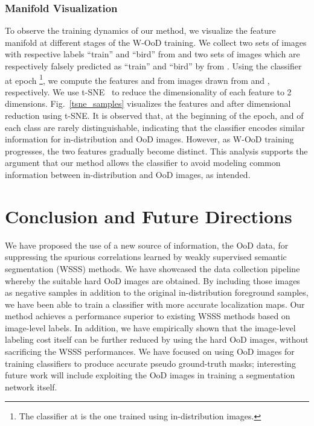 \documentclass[10pt,twocolumn,letterpaper]{article}
\begin{document}
\begin{table*}[t]
\begin{minipage}{0.3\linewidth}
{\subsubsection{Manifold Visualization}
\vspace{-0.4em}
To observe the training dynamics of our method, we visualize the feature manifold at different stages of the W-OoD training. 
We collect two sets of images with respective labels ``train'' and ``bird'' from  and two sets of images which are respectively falsely predicted as ``train'' and ``bird'' by  from .
Using the classifier at epoch \footnote{The classifier at  is the one trained using in-distribution images.}, we compute the features  and  from images drawn from  and , respectively.
We use t-SNE~\cite{maaten2008visualizing} to reduce the dimensionality of each feature to 2 dimensions.
Fig.~\ref{tsne_samples} visualizes the features  and  after dimensional reduction using t-SNE. 
It is observed that, at the beginning of the epoch,  and  of each class are rarely distinguishable, indicating that the classifier encodes similar information for in-distribution and OoD images. However, as W-OoD training progresses, the two features gradually become distinct.
This analysis supports the argument that our method allows the classifier to avoid modeling common information between in-distribution and OoD images, as intended.























\vspace{-0.5em}
\section{Conclusion and Future Directions}
\vspace{-0.3em}
We have proposed the use of a new source of information, the OoD data, for suppressing the spurious correlations learned by weakly supervised semantic segmentation (WSSS) methods. 
We have showcased the data collection pipeline whereby the suitable hard OoD images are obtained.
By including those images as negative samples in addition to the original in-distribution foreground samples, we have been able to train a classifier with more accurate localization maps. 
Our method achieves a performance superior to existing WSSS methods based on image-level labels.
In addition, we have empirically shown that the image-level labeling cost itself can be further reduced by using the hard OoD images, without sacrificing the WSSS performances. 
We have focused on using OoD images for training classifiers to produce accurate pseudo ground-truth masks; interesting future work will include exploiting the OoD images in training a segmentation network itself.





}
\end{minipage}
\end{table*}
\end{document}
